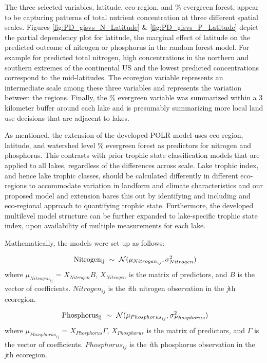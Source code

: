 \documentclass[fleqn,10pt,lineno]{wlpeerj} %
\begin{document}
The three selected variables, latitude, eco-region, and \% evergreen forest, appear to be capturing patterns of total nutrient concentration at three different spatial scales.
Figures \ref{fig:PD_gisvs_N_Latitude} \& \ref{fig:PD_gisvs_P_Latitude} depict the partial dependency plot for latitude, the marginal effect of latitude on the predicted outcome of nitrogen or phosphorus in the random forest model. For example for predicted total nitrogen, high concentrations in the northern and southern extremes of the continental US and the lowest predicted concentrations correspond to the mid-latitudes. The ecoregion variable represents an intermediate scale among these three variables and represents the variation between the regions. Finally, the \% evergreen variable was summarized within a 3 kilometer buffer around each lake and is presumably summarizing more local land use decisions that are adjacent to lakes.

As mentioned, the extension of the developed POLR model uses eco-region, latitude, and watershed level \% evergreen forest as predictors for nitrogen and phosphorus. This contrasts with prior trophic state classification models that are applied to all lakes, regardless of the differences across scale. Lake trophic index, and hence lake trophic classes, should be calculated differently in different eco-regions to accommodate variation in landform and climate characteristics and our proposed model and extension bares this out by identifying and including and eco-regional approach to quantifying trophic state. Furthermore, the developed multilevel model structure can be further expanded to lake-specific trophic state index, upon availability of multiple measurements for each lake.

Mathematically, the models were set up as follows:

\begin{equation}
\mathrm{  \ Nitrogen_{ij}} \ \sim \ \mathcal{N}( \mu_{{Nitrogen}_{ij}},\sigma_{Nitrogen}^2)\\
\end{equation}
where \(\mu_{{Nitrogen}_{ij}}\) = \(X_{Nitrogen}B\), \(X_{Nitrogen}\) is the matrix of predictors, and \(B\) is the vector of coefficients. \(Nitrogen_{ij}\) is the \emph{i}th nitrogen observation in the \emph{j}th ecoregion.

\begin{equation}
\mathrm{  \ Phosphorus_{ij}} \ \sim \ \mathcal{N}( \mu_{{Phosphorus}_{ij}},\sigma_{Phosphorus}^2)\\
\end{equation}
where \(\mu_{{Phosphorus}_{ij}}\) = \(X_{Phosphorus}\Gamma\), \(X_{Phosphorus}\) is the matrix of predictors, and \(\Gamma\) is the vector of coefficients. \(Phosphorus_{ij}\) is the \emph{i}th phosphorus observation in the \emph{j}th ecoregion.
\end{document}
